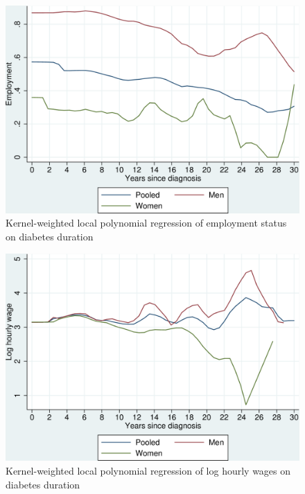 \documentclass[12pt,english,british]{article}
\begin{document}
\begin{figure}[h!]
\begin{center}
\includegraphics[width=0.7\columnwidth]{figures/lpoly_works_diabetesduration/lpoly_works_diabetesduration}
\caption{\label{fig:Kernel-weighted-local-polynomial_empl}Kernel-weighted local
polynomial regression of employment status on diabetes duration}%
\end{center}
\end{figure}

\begin{figure}[h!]
\begin{center}
\includegraphics[width=0.7\columnwidth]{figures/lpoly_wage_diabetesduration/lpoly_wage_diabetesduration}
\caption{\label{fig:Kernel-weighted-local-polynomial_wage}Kernel-weighted local
polynomial regression of log hourly wages on diabetes duration}%
\end{center}
\end{figure}
\end{document}
